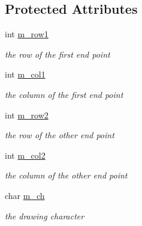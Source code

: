 \subsection*{Protected Attributes}
\begin{DoxyCompactItemize}
\item 
\hypertarget{classLine_a51f23ff1468a17bb6cfd3b5542bbc016}{
int \hyperlink{classLine_a51f23ff1468a17bb6cfd3b5542bbc016}{m\_\-row1}}
\label{classLine_a51f23ff1468a17bb6cfd3b5542bbc016}

\begin{DoxyCompactList}\small\item\em the row of the first end point \item\end{DoxyCompactList}\item 
\hypertarget{classLine_aac38f7fd7ce511d459918defad228954}{
int \hyperlink{classLine_aac38f7fd7ce511d459918defad228954}{m\_\-col1}}
\label{classLine_aac38f7fd7ce511d459918defad228954}

\begin{DoxyCompactList}\small\item\em the column of the first end point \item\end{DoxyCompactList}\item 
\hypertarget{classLine_a1bf05211608ec421379dd011f7ffff8e}{
int \hyperlink{classLine_a1bf05211608ec421379dd011f7ffff8e}{m\_\-row2}}
\label{classLine_a1bf05211608ec421379dd011f7ffff8e}

\begin{DoxyCompactList}\small\item\em the row of the other end point \item\end{DoxyCompactList}\item 
\hypertarget{classLine_a653ef8926892973fd8e5fdc743f4f5f8}{
int \hyperlink{classLine_a653ef8926892973fd8e5fdc743f4f5f8}{m\_\-col2}}
\label{classLine_a653ef8926892973fd8e5fdc743f4f5f8}

\begin{DoxyCompactList}\small\item\em the column of the other end point \item\end{DoxyCompactList}\item 
\hypertarget{classLine_a57f00e058f608b8c858585fff50d129f}{
char \hyperlink{classLine_a57f00e058f608b8c858585fff50d129f}{m\_\-ch}}
\label{classLine_a57f00e058f608b8c858585fff50d129f}

\begin{DoxyCompactList}\small\item\em the drawing character \item\end{DoxyCompactList}\end{DoxyCompactItemize}


